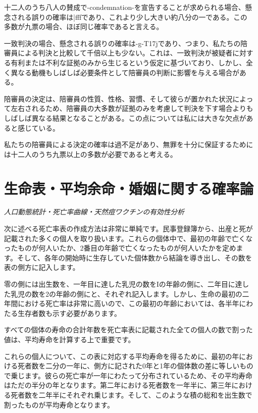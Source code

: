 \documentclass[a4paper,11pt,openany]{ltjsbook}
\begin{document}
十二人のうち八人の賛成で-condemnation-を宣告することが求められる場合、懸念される誤りの確率は|fffであり、これより少し大きい約八分の一である。この多数が九票の場合、ほぼ同じ確率であると言える。

一致判決の場合、懸念される誤りの確率は-g-T17jであり、つまり、私たちの陪審員による判決と比較して千倍以上も少ない。これは、一致判決が被疑者に対する有利または不利な証拠のみから生じるという仮定に基づいており、しかし、全く異なる動機もしばしば必要条件として陪審員の判断に影響を与える場合がある。

陪審員の決定は、陪審員の性質、性格、習慣、そして彼らが置かれた状況によって左右されるため、陪審員の大多数が証拠のみを考慮して判決を下す場合よりもしばしば異なる結果となることがある。この点については私には大きな欠点があると感じている。

私たちの陪審員による決定の確率は過不足があり、無罪を十分に保証するためには十二人のうち九票以上の多数が必要であると考える。

\newpage

\chapter{生命表・平均余命・婚姻に関する確率論}
\label{ch:xiv}

\begin{center}
\large\textit{人口動態統計・死亡率曲線・天然痘ワクチンの有効性分析}
\end{center}
\vspace{4mm}

次に述べる死亡率表の作成方法は非常に単純です。民事登録簿から、出産と死が記載された多くの個人を取り扱います。これらの個体中で、最初の年齢で亡くなったものが何人いたか、2番目の年齢で亡くなったものが何人いたかを定めます。そして、各年の開始時に生存していた個体数から結論を導き出し、その数を表の側方に記入します。

零の側には出生数を、一年目に達した乳児の数をIの年齢の側に、二年目に達した乳児の数を2の年齢の側にと、それぞれ記入します。しかし、生命の最初の二年間における死亡率は非常に高いので、この最初の年齢においては、各半年にわたる生存者数も示す必要があります。

すべての個体の寿命の合計年数を死亡率表に記載された全ての個人の数で割った値は、平均寿命を計算する上で重要です。

これらの個人について、この表に対応する平均寿命を得るために、最初の年における死者数を二分の一年に、側方に記された0年と1年の個体数の差に等しいもので乗じます。彼らの死亡率が一年にわたって分布されているため、その平均寿命はただの半分の年となります。第二年における死者数を一年半に、第三年における死者数を二年半にそれぞれ乗じます。そして、このような積の総和を出生数で割ったものが平均寿命となります。
\end{document}
